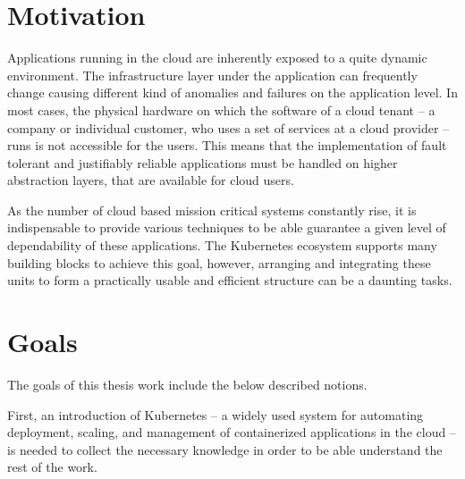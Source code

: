 \section{Motivation}

Applications running in the cloud are inherently exposed to a quite dynamic environment. The infrastructure layer under the application can frequently change causing different kind of anomalies and failures on the application level. In most cases, the physical hardware on which the software of a cloud tenant -- a company or individual customer, who uses a set of services at a cloud provider -- runs is not accessible for the users. This means that the implementation of fault tolerant and justifiably reliable applications must be handled on higher abstraction layers, that are available for cloud users.

As the number of cloud based mission critical systems constantly rise, it is indispensable to provide various techniques to be able guarantee a given level of dependability of these applications. The Kubernetes ecosystem supports many building blocks to achieve this goal, however, arranging and integrating these units to form a practically usable and efficient structure can be a daunting tasks.


\section{Goals}

The goals of this thesis work include the below described notions.

First, an introduction of Kubernetes -- a widely used system for automating deployment, scaling, and management of containerized applications in the cloud -- is needed to collect the necessary knowledge in order to be able understand the rest of the work.

